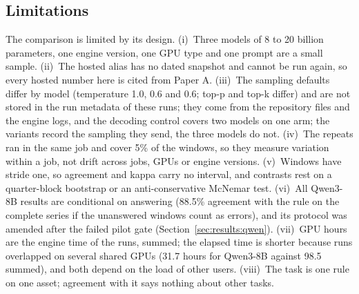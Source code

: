 \subsection{Limitations}
\label{sec:discussion:limits}

The comparison is limited by its design. (i)~Three models of 8 to 20 billion parameters, one engine version, one GPU type and one prompt are a small sample. (ii)~The hosted alias has no dated snapshot and cannot be run again, so every hosted number here is cited from Paper A. (iii)~The sampling defaults differ by model (temperature 1.0, 0.6 and 0.6; top-p and top-k differ) and are not stored in the run metadata of these runs; they come from the repository files and the engine logs, and the decoding control covers two models on one arm; the variants record the sampling they send, the three models do not. (iv)~The repeats ran in the same job and cover 5\% of the windows, so they measure variation within a job, not drift across jobs, GPUs or engine versions. (v)~Windows have stride one, so agreement and kappa carry no interval, and contrasts rest on a quarter-block bootstrap or an anti-conservative McNemar test. (vi)~All Qwen3-8B results are conditional on answering (88.5\% agreement with the rule on the complete series if the unanswered windows count as errors), and its protocol was amended after the failed pilot gate (Section~\ref{sec:results:qwen}). (vii)~GPU hours are the engine time of the runs, summed; the elapsed time is shorter because runs overlapped on several shared GPUs (31.7 hours for Qwen3-8B against 98.5 summed), and both depend on the load of other users. (viii)~The task is one rule on one asset; agreement with it says nothing about other tasks.
